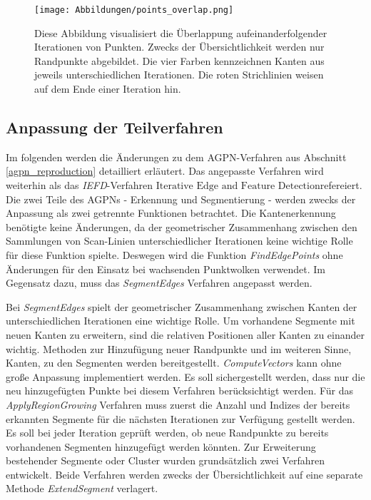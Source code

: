 \begin{figure}[h]
	\texttt{[image: Abbildungen/points\_overlap.png]}
	\centering
	\caption{Diese Abbildung visualisiert die Überlappung aufeinanderfolgender Iterationen von Punkten. Zwecks der Übersichtlichkeit werden nur Randpunkte abgebildet. Die vier Farben kennzeichnen Kanten aus jeweils unterschiedlichen Iterationen. Die roten Strichlinien weisen auf dem Ende einer Iteration hin.}
	\label{fig: point_overlap}
\end{figure}

\subsection{Anpassung der Teilverfahren}
Im folgenden werden die Änderungen zu dem AGPN-Verfahren aus Abschnitt \ref{agpn_reproduction} detailliert erläutert. Das angepasste Verfahren wird weiterhin als das \textit{IEFD}-Verfahren \textit{\(\text{Iterative Edge and Feature Detection}\)}refereiert. Die zwei Teile des AGPNs - Erkennung und Segmentierung - werden zwecks der Anpassung als zwei getrennte Funktionen betrachtet. Die Kantenerkennung benötigte keine Änderungen, da der geometrischer Zusammenhang zwischen den Sammlungen von Scan-Linien unterschiedlicher Iterationen keine wichtige Rolle für diese Funktion spielte. Deswegen wird die Funktion \textit{FindEdgePoints} ohne Änderungen für den Einsatz bei wachsenden Punktwolken verwendet. Im Gegensatz dazu, muss das \textit{SegmentEdges} Verfahren angepasst werden.

Bei \textit{SegmentEdges} spielt der geometrischer Zusammenhang zwischen Kanten der unterschiedlichen Iterationen eine wichtige Rolle. Um vorhandene Segmente mit neuen Kanten zu erweitern, sind die relativen Positionen aller Kanten zu einander wichtig. Methoden zur Hinzufügung neuer Randpunkte und im weiteren Sinne, Kanten, zu den Segmenten werden bereitgestellt. \textit{ComputeVectors} kann ohne große Anpassung implementiert werden. Es soll sichergestellt werden, dass nur die neu hinzugefügten Punkte bei diesem Verfahren berücksichtigt werden. Für das \textit{ApplyRegionGrowing} Verfahren muss zuerst die Anzahl und Indizes der bereits erkannten Segmente für die nächsten Iterationen zur Verfügung gestellt werden. Es soll bei jeder Iteration geprüft werden, ob neue Randpunkte zu bereits vorhandenen Segmenten hinzugefügt werden könnten. Zur Erweiterung bestehender Segmente oder Cluster wurden grundsätzlich zwei Verfahren entwickelt. Beide Verfahren werden zwecks der Übersichtlichkeit auf eine separate Methode \textit{ExtendSegment} verlagert.

